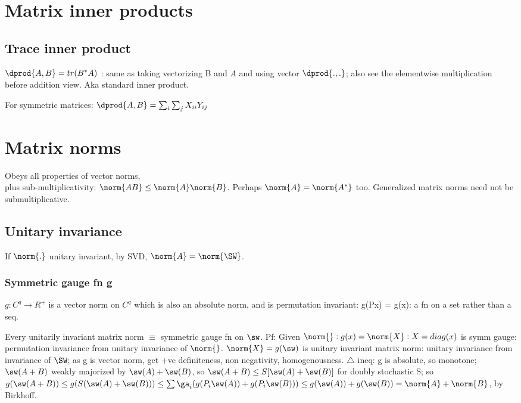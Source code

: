 \documentclass[oneside, article]{memoir}
\begin{document}
\section{Matrix inner products}
\subsection{Trace inner product}
$\dprod{A,B} = tr(B^{*}A)$ : same as taking vectorizing B and $A$ and using vector $\dprod{.,.}$; also see the elementwise multiplication before addition view. Aka standard inner product.

For symmetric matrices: $\dprod{A, B} = \sum_i \sum_j X_{ii} Y_{ij}$

\section{Matrix norms}
Obeys all properties of vector norms,\\
plus sub-multiplicativity: $\norm{AB} \leq \norm{A} \norm{B}$. Perhaps $\norm{A} = \norm{A^{*}}$ too. Generalized matrix norms need not be submultiplicative.

\subsection{Unitary invariance}
If $\norm{.}$ unitary invariant, by SVD, $\norm{A} = \norm{\SW}$.

\subsubsection{Symmetric gauge fn g}
$g:C^{q} \to R^{+}$ is a vector norm on $C^{q}$ which is also an absolute norm, and is permutation invariant: g(Px) = g(x): a fn on a set rather than a seq.

Every unitarily invariant matrix norm $\equiv$ symmetric gauge fn on $\sw$. Pf: Given $\norm{}: g(x) = \norm{X}: X = diag(x)$ is symm gauge: permutation invariance from unitary invariance of $\norm{}$. $\norm{X} = g(\sw)$ is unitary invariant matrix norm: unitary invariance from invariance of $\SW$; as g is vector norm, get +ve definiteness, non negativity, homogenousness. $\triangle$ ineq: g is absolute, so monotone; $\sw(A + B)$ weakly majorized by $\sw(A) + \sw(B)$, so $\sw(A+B) \leq S[\sw(A) + \sw(B)]$ for doubly stochastic S; so $g(\sw(A+B)) \leq g(S(\sw(A)+\sw(B))) \leq \sum \ga_{i}(g(P_{i}\sw(A)) + g(P_{i}\sw(B))) \leq g(\sw(A)) + g(\sw(B)) = \norm{A} + \norm{B}$, by Birkhoff.
\end{document}

